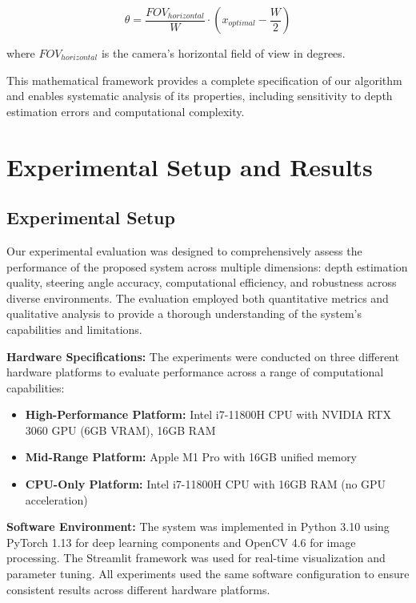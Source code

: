 \documentclass[conference]{IEEEtran}
\begin{document}
\begin{equation}
\theta = \frac{FOV_{horizontal}}{W} \cdot (x_{optimal} - \frac{W}{2})
\end{equation}

where $FOV_{horizontal}$ is the camera's horizontal field of view in degrees.

This mathematical framework provides a complete specification of our algorithm and enables systematic analysis of its properties, including sensitivity to depth estimation errors and computational complexity.

\section{Experimental Setup and Results}

\subsection{Experimental Setup}
Our experimental evaluation was designed to comprehensively assess the performance of the proposed system across multiple dimensions: depth estimation quality, steering angle accuracy, computational efficiency, and robustness across diverse environments. The evaluation employed both quantitative metrics and qualitative analysis to provide a thorough understanding of the system's capabilities and limitations.

\textbf{Hardware Specifications:}
The experiments were conducted on three different hardware platforms to evaluate performance across a range of computational capabilities:
\begin{itemize}
\item \textbf{High-Performance Platform:} Intel i7-11800H CPU with NVIDIA RTX 3060 GPU (6GB VRAM), 16GB RAM
\item \textbf{Mid-Range Platform:} Apple M1 Pro with 16GB unified memory
\item \textbf{CPU-Only Platform:} Intel i7-11800H CPU with 16GB RAM (no GPU acceleration)
\end{itemize}

\textbf{Software Environment:}
The system was implemented in Python 3.10 using PyTorch 1.13 for deep learning components and OpenCV 4.6 for image processing. The Streamlit framework was used for real-time visualization and parameter tuning. All experiments used the same software configuration to ensure consistent results across different hardware platforms.
\end{document}
